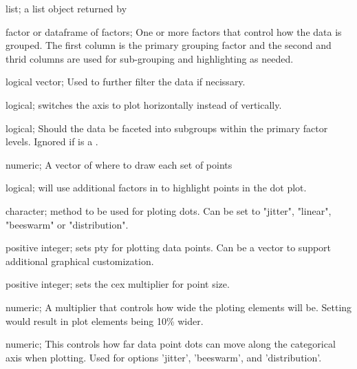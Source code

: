 \documentclass[a4paper]{book}
\begin{document}
\begin{Arguments}
\begin{ldescription}
\item[\code{prepedData}] list; a list object returned by 

\item[\code{by}] factor or dataframe of factors; One or more factors that control how the data is grouped. The first column is the primary grouping factor and the second and thrid columns are used for sub-grouping and highlighting as needed.

\item[\code{filter}] logical vector; Used to further filter the data if necissary.

\item[\code{sidePlot}] logical; switches the axis to plot horizontally instead of vertically.

\item[\code{subGroup}] logical; Should the data be faceted into subgroups within the primary factor levels. Ignored if  is a .

\item[\code{plotAt}] numeric; A vector of where to draw each set of points

\item[\code{pointHighlights}] logical; will use additional factors in  to highlight points in the dot plot.

\item[\code{pointMethod}] character; method to be used for ploting dots. Can be set to "jitter", "linear", "beeswarm" or "distribution".

\item[\code{pointShape}] positive integer; sets pty for plotting data points. Can be a vector to support additional graphical customization.

\item[\code{pointSize}] positive integer; sets the cex multiplier for point size.

\item[\code{width}] numeric; A multiplier that controls how wide the ploting elements will be. Setting  would result in plot elements being 10\% wider.

\item[\code{pointLaneWidth}] numeric; This controls how far data point dots can move along the categorical axis when plotting. Used for  options 'jitter', 'beeswarm', and 'distribution'.


\end{ldescription}
\end{Arguments}
\end{document}
